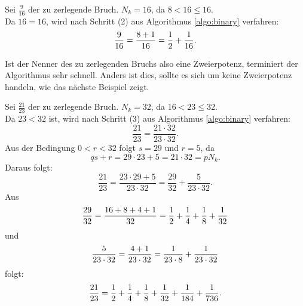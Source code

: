 \begin{bsp}
	Sei $\frac{9}{16}$ der zu zerlegende Bruch. $N_k = 16$, da $8<16\leq16$.\\
	Da $16 = 16$, wird nach Schritt (2) aus Algorithmus \ref{algo:binary} verfahren:
	$$\frac{9}{16} = \frac{8+1}{16} = \frac{1}{2}+\frac{1}{16}.$$
\end{bsp}
Ist der Nenner des zu zerlegenden Bruchs also eine Zweierpotenz, terminiert der Algorithmus sehr schnell. Anders ist dies, sollte es sich um keine Zweierpotenz handeln, wie das nächste Beispiel zeigt.
\begin{bsp}
	Sei $\frac{21}{23}$ der zu zerlegende Bruch. $N_k = 32$, da $16 < 23 \leq 32$.\\
	Da $23<32$ ist, wird nach Schritt (3) aus Algorithmus \ref{algo:binary} verfahren:
	$$\frac{21}{23} = \frac{21 \cdot 32}{23 \cdot 32}.$$
	Aus der Bedingung $0<r<32$ folgt $s = 29$ und $r = 5$, da $$qs+r = 29 \cdot 23 + 5 = 21 \cdot 32 = p N_k.$$
	Daraus folgt:
	$$\frac{21}{23} = \frac{23 \cdot 29+5}{23 \cdot 32} = \frac{29}{32} + \frac{5}{23 \cdot 32}.$$
	Aus $$\frac{29}{32} = \frac{16+8+4+1}{32} = \frac{1}{2} + \frac{1}{4} + \frac{1}{8} + \frac{1}{32}$$ und $$\frac{5}{23 \cdot 32} = \frac{4+1}{23 \cdot 32} = \frac{1}{23 \cdot 8} + \frac{1}{23 \cdot 32}$$ folgt:
	$$\frac{21}{23} = \frac{1}{2} + \frac{1}{4} + \frac{1}{8} + \frac{1}{32} + \frac{1}{184} + \frac{1}{736}.$$
\end{bsp}